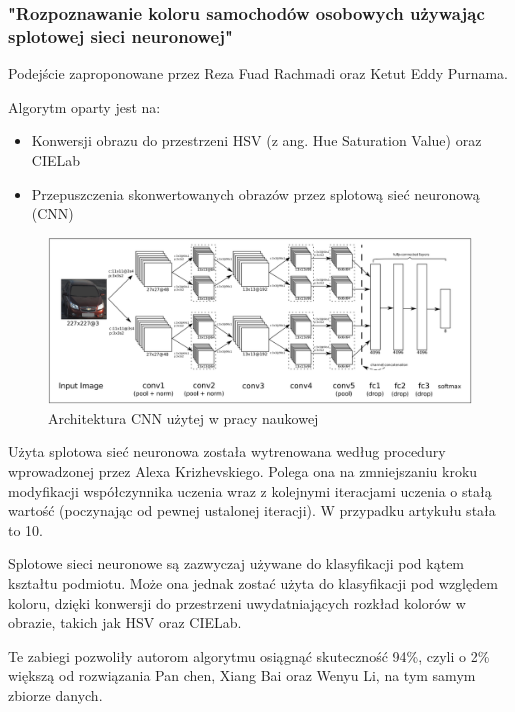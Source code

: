 \subsubsection{"\null{}Rozpoznawanie koloru samochodów osobowych używając splotowej sieci neuronowej" \cite{Su2015/12}}
Podejście zaproponowane przez Reza Fuad Rachmadi oraz Ketut Eddy Purnama.

Algorytm oparty jest na:
\begin{itemize}
    \item Konwersji obrazu do przestrzeni HSV (z ang. Hue Saturation Value) oraz CIELab
    \item Przepuszczenia skonwertowanych obrazów przez splotową sieć neuronową (CNN)
\end{itemize}

\pagebreak

\begin{figure}
    \begin{center}
        \includegraphics[scale=0.6]{img/cnn_arch.png}
    \end{center}
    \caption{Architektura CNN użytej w pracy naukowej}
    \label{fig:cnn_arch}
\end{figure}

Użyta splotowa sieć neuronowa została wytrenowana według procedury wprowadzonej przez Alexa Krizhevskiego. Polega ona na zmniejszaniu kroku modyfikacji współczynnika uczenia wraz z kolejnymi iteracjami uczenia o stałą wartość (poczynając od pewnej ustalonej iteracji). W przypadku artykułu stała to 10.

Splotowe sieci neuronowe są zazwyczaj używane do klasyfikacji pod kątem kształtu podmiotu. Może ona jednak zostać użyta do klasyfikacji pod względem koloru, dzięki konwersji do przestrzeni uwydatniających rozkład kolorów w obrazie, takich jak HSV oraz CIELab. 

Te zabiegi pozwoliły autorom algorytmu osiągnąć skuteczność 94\%, czyli o 2\% większą od rozwiązania Pan chen, Xiang Bai oraz Wenyu Li, na tym samym zbiorze danych. 

